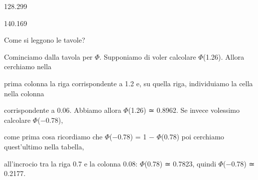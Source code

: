 \documentclass[a4paper,portrait,12pt]{article}
\begin{document}
128.299


140.169





\begin{flushleft}
Come si leggono le tavole?
\end{flushleft}


\begin{flushleft}
Cominciamo dalla tavola per $\Phi$. Supponiamo di voler calcolare $\Phi$(1.26). Allora cerchiamo nella
\end{flushleft}


\begin{flushleft}
prima colonna la riga corrispondente a 1.2 e, su quella riga, individuiamo la cella nella colonna
\end{flushleft}


\begin{flushleft}
corrispondente a 0.06. Abbiamo allora $\Phi$(1.26) ≃ 0.8962. Se invece volessimo calcolare $\Phi$($-$0.78),
\end{flushleft}


\begin{flushleft}
come prima cosa ricordiamo che $\Phi$($-$0.78) = 1 $-$ $\Phi$(0.78) poi cerchiamo quest'ultimo nella tabella,
\end{flushleft}


\begin{flushleft}
all'incrocio tra la riga 0.7 e la colonna 0.08: $\Phi$(0.78) ≃ 0.7823, quindi $\Phi$($-$0.78) ≃ 0.2177.
\end{flushleft}





\newpage
\end{document}
